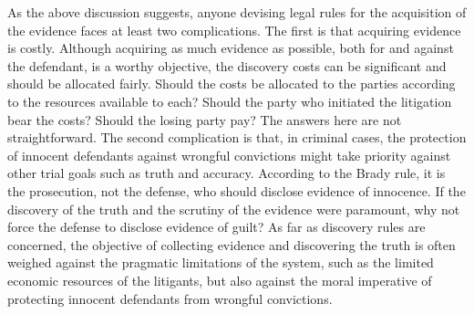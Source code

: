 \documentclass[10pt]{article}
\begin{document}

As the above discussion suggests, anyone devising legal rules for the acquisition of the evidence faces
at least two complications.  The first is that acquiring evidence is costly. Although acquiring as much evidence as possible, both for and against the defendant, is a worthy objective, the discovery costs can be significant and should be allocated fairly. Should the costs be allocated to the parties according to the resources available to each? Should the party who initiated the litigation bear the costs? Should the losing party pay? The answers here are not straightforward.  The second complication is that, in criminal cases, the protection of innocent defendants against wrongful convictions might take priority against other trial goals such as truth and accuracy. According to the Brady rule, it is the prosecution, not the defense, who should disclose evidence of innocence. If the discovery of the truth and the scrutiny of the evidence were paramount, why not force the defense to disclose evidence of guilt? As far as discovery rules are concerned, the objective of collecting evidence and discovering the truth is often weighed against the pragmatic limitations of the system, such as the limited economic resources of the litigants, but also against the moral imperative of protecting innocent defendants from wrongful convictions.



\end{document}
